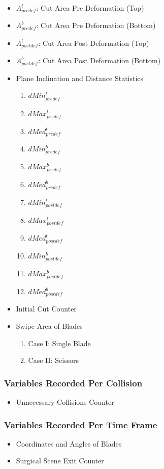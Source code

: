 \begin{itemize}[\tiny$\blacksquare$]
  \item $A^t_{predef}$: Cut Area Pre Deformation (Top)
  \item $A^b_{predef}$: Cut Area Pre Deformation (Bottom)
  \item $A^t_{postdef}$: Cut Area Post Deformation (Top)
  \item $A^b_{postdef}$: Cut Area Post Deformation (Bottom)
  \item Plane Inclination and Distance Statistics
	  \begin{enumerate}[1.]
	    \item $dMin_{predef}^t$
	    \item $dMax_{predef}^t$
	    \item $dMed_{predef}^t$
	    \item $dMin_{predef}^b$
	    \item $dMax_{predef}^b$
	    \item $dMed_{predef}^b$
	    \item $dMin_{postdef}^t$
	    \item $dMax_{postdef}^t$
	    \item $dMed_{postdef}^t$
	    \item $dMin_{postdef}^b$
	    \item $dMax_{postdef}^b$
	    \item $dMed_{postdef}^b$
	  \end{enumerate}
  \item Initial Cut Counter
  \item Swipe Area of Blades
  \begin{enumerate}[1.]
	  \item Case I: Single Blade
	  \item Case II: Scissors
  \end{enumerate}
\end{itemize}

\subsubsection{Variables Recorded Per Collision}
\begin{itemize}[\tiny$\blacksquare$]
  \item Unnecessary Collisions Counter
\end{itemize}

\subsubsection{Variables Recorded Per Time Frame}
\begin{itemize}[\tiny$\blacksquare$]
  \item Coordinates and Angles of Blades
  \item Surgical Scene Exit Counter
\end{itemize}

